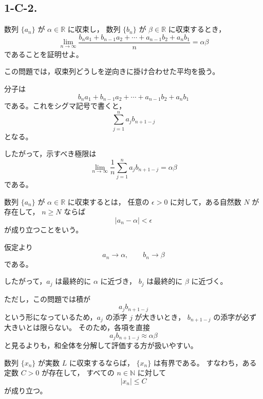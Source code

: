 \subsection{1-C-2.}
\begin{exercise}
    数列 $\{a_n\}$ が $\alpha\in\mathbb{R}$ に収束し，
    数列 $\{b_n\}$ が $\beta\in\mathbb{R}$ に収束するとき，
    \[
        \lim_{n\to\infty}
        \frac{
            b_n a_1+b_{n-1}a_2+\cdots+a_{n-1}b_2+a_n b_1
        }{n}
        =
        \alpha\beta
    \]
    であることを証明せよ。
\end{exercise}
\begin{background}
    この問題では，収束列どうしを逆向きに掛け合わせた平均を扱う。

    分子は
    \[
        b_n a_1+b_{n-1}a_2+\cdots+a_{n-1}b_2+a_n b_1
    \]
    である。これをシグマ記号で書くと，
    \[
        \sum_{j=1}^{n}a_jb_{n+1-j}
    \]
    となる。

    したがって，示すべき極限は
    \[
        \lim_{n\to\infty}
        \frac{1}{n}
        \sum_{j=1}^{n}a_jb_{n+1-j}
        =
        \alpha\beta
    \]
    である。

    \begin{definition}[数列の収束]
		数列 $\{a_n\}$ が $\alpha\in\mathbb{R}$ に収束するとは，
        任意の $\epsilon>0$ に対して，ある自然数 $N$ が存在して，
        $n\geq N$ ならば
        \[
            |a_n-\alpha|<\epsilon
        \]
        が成り立つことをいう。
    \end{definition}

    \begin{remark}
        仮定より
        \[
            a_n\to\alpha,
            \qquad
            b_n\to\beta
        \]
        である。

        したがって，$a_j$ は最終的に $\alpha$ に近づき，
        $b_j$ は最終的に $\beta$ に近づく。

        ただし，この問題では積が
        \[
            a_jb_{n+1-j}
        \]
        という形になっているため，$a_j$ の添字 $j$ が大きいとき，
        $b_{n+1-j}$ の添字が必ず大きいとは限らない。
        そのため，各項を直接
        \[
            a_jb_{n+1-j}\approx \alpha\beta
        \]
        と見るよりも，和全体を分解して評価する方が扱いやすい。
    \end{remark}

    \begin{lemma}[収束列は有界]
		数列 $\{x_n\}$ が実数 $L$ に収束するならば，
        $\{x_n\}$ は有界である。
        すなわち，ある定数 $C>0$ が存在して，
        すべての $n\in\mathbb{N}$ に対して
        \[
            |x_n|\leq C
        \]
        が成り立つ。
    \end{lemma}


\end{background}
